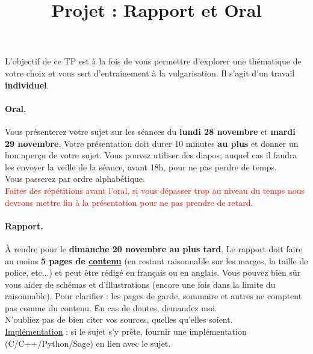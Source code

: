 \documentclass[french,a4paper,11pt]{exam}
\title{\textbf{Projet : Rapport et Oral}}
\date{}
\begin{document}
\maketitle

L'objectif de ce TP est à la fois de vous permettre d'explorer une thématique de votre choix et vous sert d'entrainement à la vulgarisation. Il s'agit d'un travail \textbf{individuel}.

\paragraph{Oral. } Vous présenterez votre sujet sur les séances du \textbf{lundi
  28 novembre} et \textbf{mardi 29 novembre}. Votre présentation doit durer 10
minutes \textbf{au plus} et donner un bon aperçu de votre sujet. Vous pouvez
utiliser des diapos, auquel cas il faudra les envoyer la veille de la séance,
avant 18h, pour ne pas perdre de temps.\\
Vous passerez par ordre alphabétique.\\
\textcolor{red}{Faites des répétitions avant l'oral, si vous dépasser trop au niveau du temps nous devrons mettre fin à la présentation pour ne pas prendre de retard.} %


\paragraph{Rapport. } À rendre pour le \textbf{dimanche 20 novembre au plus tard}. Le rapport doit faire au moins \textbf{5 pages de \underline{contenu}} (en restant raisonnable sur les marges, la taille de police, etc...) et peut être rédigé en français ou en anglais. Vous pouvez bien sûr vous aider de schémas et d’illustrations (encore une fois dans la limite du raisonnable). Pour clarifier : les pages de garde, sommaire et autres ne comptent pas comme du contenu. En cas de doutes, demandez moi.\\
N’oubliez pas de bien citer vos sources, quelles qu’elles soient.\\
\underline{Implémentation} : si le sujet s'y prête, fournir une implémentation (C/C++/Python/Sage) en lien avec le sujet.
\end{document}
